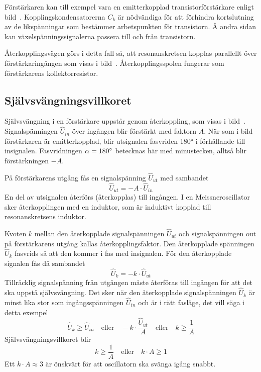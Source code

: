 Förstärkaren kan till exempel vara en emitterkopplad transistorförstärkare
enligt bild~.
Kopplingskondensatorerna \(C_k\) är nödvändiga för att förhindra kortslutning
av de likspänningar som bestämmer arbetspunkten för transistorn.
Å andra sidan kan växelspänningssignalerna passera till och från transistorn.

Återkopplingsvägen görs i detta fall så, att resonanskretsen kopplas
parallellt över förstärkaringången som visas i bild~.
Återkopplingsspolen fungerar som förstärkarens kollektorresistor.

\subsection{Självsvängningsvillkoret}


Självsvängning i en förstärkare uppstår genom återkoppling, som visas i
bild~.
Signalspänningen \(\hat{U}_{in}\) över ingången blir förstärkt med
faktorn \(A\).
När som i bild~ förstärkaren är emitterkopplad, blir
utsignalen fasvriden \ang{180} i förhållande till insignalen.
Fasvridningen \(\alpha=180\degree\) betecknas här med minustecken, alltså blir
förstärkningen \(-A\).

På förstärkarens utgång fås en signalspänning \(\hat{U}_{ut}\) med sambandet
%
\[\hat{U}_{ut} = -A \cdot \hat{U}_{in}\]
%
En del av utsignalen återförs (återkopplas) till ingången.
I en Meissneroscillator sker återkopplingen med en induktor, som är induktivt
kopplad till resonanskretsens induktor.

Kvoten \(k\) mellan den återkopplade signalspänningen \(\hat{U}_{ut}\) och
signalspänningen out på förstärkarens utgång kallas återkopplingsfaktor.
Den återkopplade spänningen \(\hat{U}_k\) fasvrids så att den kommer i fas med
insignalen.
För den återkopplade signalen fås då sambandet
%
\[\hat{U}_k = -k \cdot \hat{U}_{ut}\]
%
Tillräcklig signalspänning från utgången måste återföras till ingången
för att det ska uppstå självsvängning.
Det sker när den återkopplade signalspänningen \(\hat{U}_k\) är minst lika stor
som ingångsspänningen \(\hat{U}_{in}\) och är i rätt fasläge, det vill säga i
detta exempel
%
\[
\hat{U}_k \geq \hat{U}_{in}
\quad \text{eller} \quad
-k \cdot \frac{\hat{U}_{ut}}{A}
\quad \text{eller} \quad
k \geq \frac{1}{A}
\]
%
Självsvängningsvillkoret blir
%
\[
k \geq \frac{1}{A}
\quad \text{eller} \quad
k \cdot A \geq 1
\]
%
Ett \(k \cdot A \approx 3\) är önskvärt för att oscillatorn ska svänga igång
snabbt.

